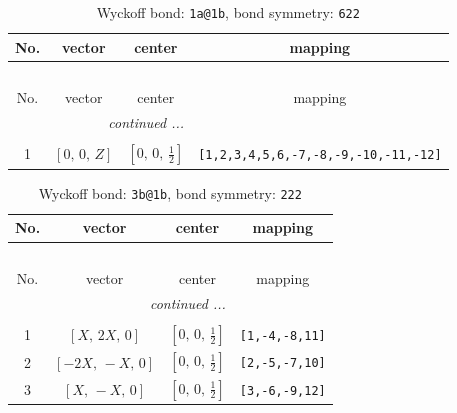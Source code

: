 \documentclass[fleqn,8pt]{jsarticle}
\begin{document}
\begin{longtable}{cccc}
\caption{Wyckoff bond: {\tt 1a@1b}, bond symmetry: {\tt 622}}
 \\
 \hline \hline
No. & vector & center & mapping \\ \hline \endfirsthead

\multicolumn{3}{l}{\tablename\ \thetable{}} \\
 \hline \hline
No. & vector & center & mapping \\ \hline \endhead

 \hline \hline
\multicolumn{3}{r}{\footnotesize\it continued ...} \\ \endfoot

 \hline \hline
\multicolumn{3}{r}{} \\ \endlastfoot

1 & $\left[ 0,\, 0,\, Z \right]$ & $\left[ 0,\, 0,\, \frac{1}{2} \right]$ & {\tt [1,2,3,4,5,6,-7,-8,-9,-10,-11,-12]} \\
\end{longtable}
\renewcommand{\arraystretch}{1.2}
\begin{longtable}{cccc}
\caption{Wyckoff bond: {\tt 3b@1b}, bond symmetry: {\tt 222}}
 \\
 \hline \hline
No. & vector & center & mapping \\ \hline \endfirsthead

\multicolumn{3}{l}{\tablename\ \thetable{}} \\
 \hline \hline
No. & vector & center & mapping \\ \hline \endhead

 \hline \hline
\multicolumn{3}{r}{\footnotesize\it continued ...} \\ \endfoot

 \hline \hline
\multicolumn{3}{r}{} \\ \endlastfoot

1 & $\left[ X,\, 2 X,\, 0 \right]$ & $\left[ 0,\, 0,\, \frac{1}{2} \right]$ & {\tt [1,-4,-8,11]} \\ \hline
2 & $\left[ - 2 X,\, - X,\, 0 \right]$ & $\left[ 0,\, 0,\, \frac{1}{2} \right]$ & {\tt [2,-5,-7,10]} \\ \hline
3 & $\left[ X,\, - X,\, 0 \right]$ & $\left[ 0,\, 0,\, \frac{1}{2} \right]$ & {\tt [3,-6,-9,12]} \\
\end{longtable}
\renewcommand{\arraystretch}{1.2}
\end{document}
